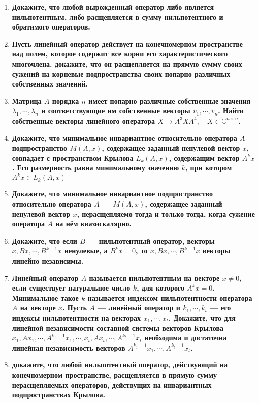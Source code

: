 \documentclass[12pt]{article} %
\begin{document}
\begin{enumerate}
    \item \textbf{Докажите, что любой вырожденный оператор либо является нильпотентным, либо расщепляется в сумму нильпотентного и обратимого операторов.}
    \item \textbf{Пусть линейный оператор действует на конечномерном пространстве над полем, которое содержит все корни его характеристического многочлена. докажите, что он расщепляется на прямую сумму своих сужений на корневые подпространства своих попарно различных собственных значений.}
    \item \textbf{Матрица $A$ порядка $n$ имеет попарно различные собственные значения $\lambda_1, \cdots ,\lambda_n$ и соответствующие им собственные векторы $v_1, \cdots, v_n $. Найти собственные векторы линейного оператора $X \rightarrow A^3XA^4, \quad X \in \mathds{C}^{n \times n}$.}
    \item \textbf{Докажите, что минимальное инвариантное относительно оператора $A$ подпространство $M(A, x)$, содержащее заданный ненулевой вектор $x$, совпадает с пространством Крылова $L_k(A, x)$, содержащим вектор $A^kx$. Его размерность равна минимальному значению $k$, при котором $A^kx \in L_k(A, x)$}
    \item \textbf{Докажите, что минимальное инвариантное подпространство относительно оператора $A$ --- $M(A, x)$, содержащее заданный ненулевой вектор $x$, нерасщепляемо тогда и только тогда, когда сужение оператора $A$ на нём квазискалярно.}
    \item \textbf{Докажите, что если $B$ --- нильпотентный оператор, векторы $x, Bx, \cdots, B^{k - 1}x$ ненулевые, а $B^kx = 0$, то $x, Bx, \cdots, B^{k - 1}x$ векторы линейно независимы.}
    \item \textbf{Линейный оператор $A$ называется нильпотентным на векторе $x \neq 0$, если существует натуральное число $k$, для которого $A^kx = 0$. Минимальное такое $k$ называется индексом нильпотентности оператора $A$  на векторе $x$. Пусть $A$ --- линейный оператор и $k_1, \cdots, k_t$ --- его индексы нильпотентности на векторах $x_1, \cdots, x_t$. Докажите, что для линейной независимости составной системы векторов Крылова $x_1, Ax_1, \cdots, A^{k_1 - 1}x_1, \cdots , x_t, Ax_t, \cdots, A^{k_t - 1}x_t$ необходима и достаточна линейная независимость векторов $A^{k_1 - 1}x_1, \cdots, A^{k_t - 1}x_t$.}
    \item \textbf{докажите, что любой нильпотентный оператор, действующий на конечномерном пространстве, расщепляется в прямую сумму нерасщепляемых операторов, действущих на инвариантных подпространствах Крылова.}

\end{enumerate}
\end{document}
